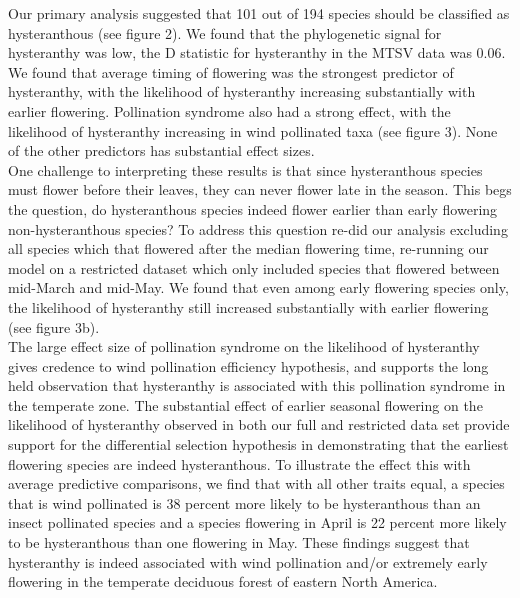 \documentclass{article}\usepackage[]{graphicx}\usepackage[]{color}
\begin{document}
\indent Our primary analysis suggested that 101 out of 194 species should be classified as hysteranthous (see figure 2). We found that the phylogenetic signal for hysteranthy was low, the D statistic for hysteranthy in the MTSV data was 0.06. We found that average timing of flowering was the strongest predictor of hysteranthy, with the likelihood of hysteranthy increasing substantially with earlier flowering. Pollination syndrome also had a strong effect, with the likelihood of hysteranthy increasing in wind pollinated taxa (see figure 3). None of the other predictors has substantial effect sizes.\\
\indent One challenge to interpreting these results is that since hysteranthous species must flower before their leaves, they can never flower late in the season. This begs the question, do hysteranthous species indeed flower earlier than early flowering non-hysteranthous species? To address this question re-did our analysis excluding all species which that flowered after the median flowering time, re-running our model on a restricted dataset which only included species that flowered between mid-March and mid-May. We found that even among early flowering species only, the likelihood of hysteranthy still increased substantially with earlier flowering (see figure 3b).\\ 
\indent The large effect size of pollination syndrome on the likelihood of hysteranthy gives credence to wind pollination efficiency hypothesis, and supports the long held observation that hysteranthy is associated with this pollination syndrome in the temperate zone. The substantial effect of earlier seasonal flowering on the likelihood of hysteranthy observed in both our full and restricted data set provide support for the differential selection hypothesis in demonstrating that the earliest flowering species are indeed hysteranthous. To illustrate the effect this with average predictive comparisons, we find that with all other traits equal, a species that is wind pollinated is 38 percent more likely to be hysteranthous than an insect pollinated species and a species flowering in April is 22 percent more likely to be hysteranthous than one flowering in May. These findings suggest that hysteranthy is indeed associated with wind pollination and/or extremely early flowering in the temperate deciduous forest of eastern North America. %
\end{document}
